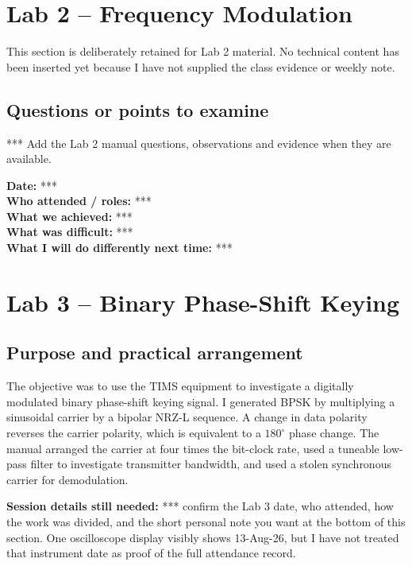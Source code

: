 \documentclass[11pt,a4paper]{article}
\newcommand{\weeklynote}[1]{\begin{notebox}#1\end{notebox}}
\newcommand{\labdivider}{\FloatBarrier\clearpage}
\begin{document}
\section{Lab 2 -- Frequency Modulation}
\begin{placeholderbox}
This section is deliberately retained for Lab 2 material. No technical content has been inserted yet because I have not supplied the class evidence or weekly note.
\vspace{30mm}
\end{placeholderbox}
\subsection{Questions or points to examine}
\begin{checkbox}*** Add the Lab 2 manual questions, observations and evidence when they are available.\end{checkbox}
\weeklynote{\textbf{Date:} ***\\\textbf{Who attended / roles:} ***\\\textbf{What we achieved:} ***\\\textbf{What was difficult:} ***\\\textbf{What I will do differently next time:} ***\vspace{18mm}}
\labdivider
\section{Lab 3 -- Binary Phase-Shift Keying}
\subsection{Purpose and practical arrangement}
The objective was to use the TIMS equipment to investigate a digitally modulated binary phase-shift keying signal. I generated BPSK by multiplying a sinusoidal carrier by a bipolar NRZ-L sequence. A change in data polarity reverses the carrier polarity, which is equivalent to a $180^\circ$ phase change. The manual arranged the carrier at four times the bit-clock rate, used a tuneable low-pass filter to investigate transmitter bandwidth, and used a stolen synchronous carrier for demodulation.

\begin{checkbox}
\textbf{Session details still needed:} *** confirm the Lab 3 date, who attended, how the work was divided, and the short personal note you want at the bottom of this section. One oscilloscope display visibly shows 13-Aug-26, but I have not treated that instrument date as proof of the full attendance record.
\end{checkbox}
\end{document}
